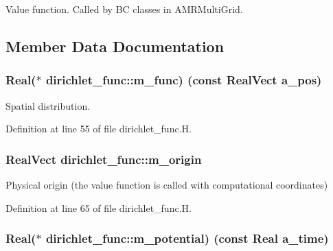 Value function. Called by BC classes in A\+M\+R\+Multi\+Grid. 



\subsection{Member Data Documentation}
\subsubsection[{\texorpdfstring{m\+\_\+func}{m_func}}]{\setlength{\rightskip}{0pt plus 5cm}Real($\ast$ dirichlet\+\_\+func\+::m\+\_\+func) (const Real\+Vect a\+\_\+pos)\hspace{0.3cm}{\ttfamily [protected]}}\hypertarget{classdirichlet__func_a337973800d112cdce7b5e5ea1cce7357}{}\label{classdirichlet__func_a337973800d112cdce7b5e5ea1cce7357}


Spatial distribution. 



Definition at line 55 of file dirichlet\+\_\+func.\+H.

\subsubsection[{\texorpdfstring{m\+\_\+origin}{m_origin}}]{\setlength{\rightskip}{0pt plus 5cm}Real\+Vect dirichlet\+\_\+func\+::m\+\_\+origin\hspace{0.3cm}{\ttfamily [protected]}}\hypertarget{classdirichlet__func_aac22852ea9503a4204f34585c0aaf6b7}{}\label{classdirichlet__func_aac22852ea9503a4204f34585c0aaf6b7}


Physical origin (the value function is called with computational coordinates) 



Definition at line 65 of file dirichlet\+\_\+func.\+H.

\subsubsection[{\texorpdfstring{m\+\_\+potential}{m_potential}}]{\setlength{\rightskip}{0pt plus 5cm}Real($\ast$ dirichlet\+\_\+func\+::m\+\_\+potential) (const Real a\+\_\+time)\hspace{0.3cm}{\ttfamily [protected]}}\hypertarget{classdirichlet__func_a54f22d2f89cebff2809deea1b770dcc3}{}\label{classdirichlet__func_a54f22d2f89cebff2809deea1b770dcc3}


